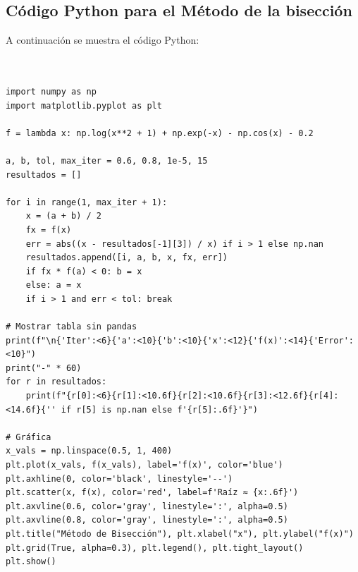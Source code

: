 \documentclass[12pt]{article}
\begin{document}
\begin{center}
\vspace{1cm}

\section*{Código Python para el Método de la bisección}

A continuación se muestra el código Python:

\begin{tcolorbox}[title=Método de la bisección,
                  colback=white,
                  colframe=black,
                  breakable, enhanced]
\begin{lstlisting}[style=mypython]


import numpy as np
import matplotlib.pyplot as plt

f = lambda x: np.log(x**2 + 1) + np.exp(-x) - np.cos(x) - 0.2

a, b, tol, max_iter = 0.6, 0.8, 1e-5, 15
resultados = []

for i in range(1, max_iter + 1):
    x = (a + b) / 2
    fx = f(x)
    err = abs((x - resultados[-1][3]) / x) if i > 1 else np.nan
    resultados.append([i, a, b, x, fx, err])
    if fx * f(a) < 0: b = x
    else: a = x
    if i > 1 and err < tol: break

# Mostrar tabla sin pandas
print(f"\n{'Iter':<6}{'a':<10}{'b':<10}{'x':<12}{'f(x)':<14}{'Error':<10}")
print("-" * 60)
for r in resultados:
    print(f"{r[0]:<6}{r[1]:<10.6f}{r[2]:<10.6f}{r[3]:<12.6f}{r[4]:<14.6f}{'' if r[5] is np.nan else f'{r[5]:.6f}'}")

# Gráfica
x_vals = np.linspace(0.5, 1, 400)
plt.plot(x_vals, f(x_vals), label='f(x)', color='blue')
plt.axhline(0, color='black', linestyle='--')
plt.scatter(x, f(x), color='red', label=f'Raíz ≈ {x:.6f}')
plt.axvline(0.6, color='gray', linestyle=':', alpha=0.5)
plt.axvline(0.8, color='gray', linestyle=':', alpha=0.5)
plt.title("Método de Bisección"), plt.xlabel("x"), plt.ylabel("f(x)")
plt.grid(True, alpha=0.3), plt.legend(), plt.tight_layout()
plt.show()


\end{lstlisting}
\end{tcolorbox}
\end{center}
\end{document}
